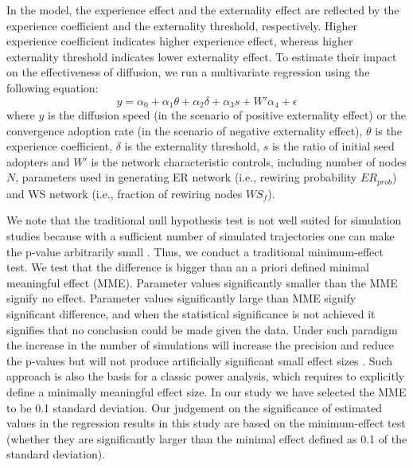 \documentclass{bmcart}
\begin{document}
In the model, the experience effect and the externality effect are reflected by the experience coefficient and the externality threshold, respectively. Higher experience coefficient indicates higher experience effect, whereas higher externality threshold indicates lower externality effect. To estimate their impact on the effectiveness of diffusion, we run a multivariate regression using the following equation:
\begin{equation}
\label{Eq: peer effects}
y=\alpha_0 + \alpha_1 \theta + \alpha_2 \delta + \alpha_3s+ W' \alpha_4 + \epsilon
\end{equation}
where $y$ is the diffusion speed (in the scenario of positive externality effect) or the convergence adoption rate (in the scenario of negative externality effect),  $\theta$ is the experience coefficient, $\delta$ is the externality threshold, $s$ is the ratio of initial seed adopters and $W'$ is the network characteristic controls, including number of nodes $N$, parameters used in generating ER network (i.e., rewiring probability $ER_{prob}$) and WS network (i.e., fraction of rewiring nodes $WS_f$).

We note that the traditional null hypothesis test is not well suited for simulation studies because with a sufficient number of simulated trajectories one can make the p-value arbitrarily small \cite{Heard2014}. Thus, we conduct a traditional minimum-effect test. We test that the difference is bigger than an a priori defined minimal meaningful effect (MME). Parameter values significantly smaller than the MME signify no effect. Parameter values significantly large than MME signify significant difference, and when the statistical significance is not achieved it signifies that no conclusion could be made given the data. Under such paradigm the increase in the number of simulations will increase the precision and reduce the p-values but will not produce artificially significant small effect sizes \cite{Wellek2010}. Such approach is also the basis for a classic power analysis, which requires to explicitly define a minimally meaningful effect size. In our study we have selected the MME to be 0.1 standard deviation. Our judgement on the significance of estimated values in the regression results in this study are based on the minimum-effect test (whether they are significantly larger than the minimal effect defined as 0.1 of the standard deviation).
\end{document}
